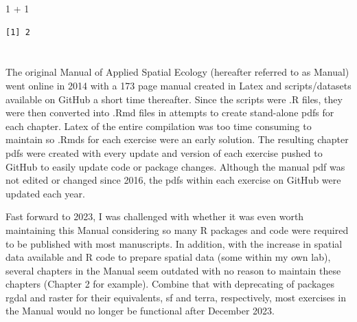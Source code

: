 \documentclass[
  letterpaper,
  DIV=11,
  numbers=noendperiod]{scrreprt}
\newenvironment{Shaded}{\begin{snugshade}}{\end{snugshade}}
\newcommand{\DecValTok}[1]{\textcolor[rgb]{0.68,0.00,0.00}{#1}}
\newcommand{\NormalTok}[1]{\textcolor[rgb]{0.00,0.23,0.31}{#1}}
\newcommand{\SpecialCharTok}[1]{\textcolor[rgb]{0.37,0.37,0.37}{#1}}
\begin{document}
\begin{Shaded}
\begin{Highlighting}[]
\DecValTok{1} \SpecialCharTok{+} \DecValTok{1}
\end{Highlighting}
\end{Shaded}

\begin{verbatim}
[1] 2
\end{verbatim}


\hypertarget{section}{%
\chapter{}\label{section}}

\begin{Shaded}
\begin{Highlighting}[]

\NormalTok{The original Manual of Applied Spatial Ecology (hereafter referred to as Manual) went online in 2014 with a 173 page manual created in Latex and scripts/datasets available on GitHub a short time thereafter. Since the scripts were .R files, they were then converted into .Rmd files in attempts to create stand{-}alone pdfs for each chapter. Latex of the entire compilation was too time consuming to maintain so .Rmds for each exercise were an early solution. The resulting chapter pdfs were created with every update and version of each exercise pushed to GitHub to easily update code or package changes. Although the manual pdf was not edited or changed since 2016, the pdfs within each exercise on GitHub were updated each year.}

\NormalTok{Fast forward to 2023, I was challenged with whether it was even worth maintaining this Manual considering so many R packages and code were required to be published with most manuscripts. In addition, with the increase in spatial data available and R code to prepare spatial data (some within my own lab), several chapters in the Manual seem outdated with no reason to maintain these chapters (Chapter 2 for example). Combine that with deprecating of packages rgdal and raster for their equivalents, sf and terra, respectively, most exercises in the Manual would no longer be functional after December 2023.}


\end{Highlighting}
\end{Shaded}
\end{document}
